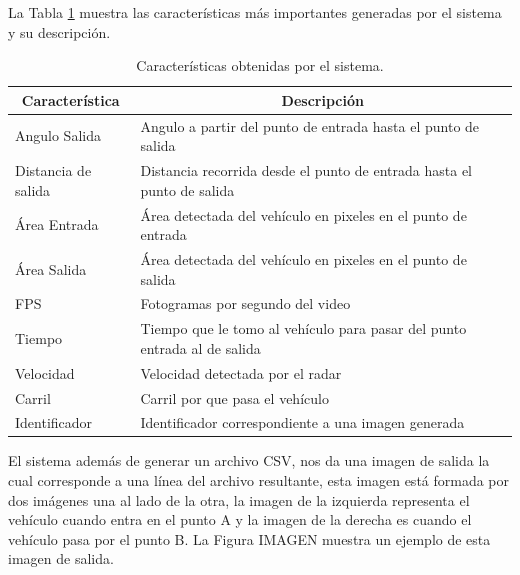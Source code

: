 La Tabla \ref{tab:CaracteristicasSistema} muestra las características más importantes generadas por el sistema y su descripción.

\begin{table}[H]
    \caption{Características obtenidas por el sistema.}
    \label{tab:CaracteristicasSistema}
    \begin{tabular}{|l|l|}
        \hline
        \multicolumn{1}{|c|}{\textbf{Característica}} & \multicolumn{1}{c|}{\textbf{Descripción}}                                \\ \hline
        Angulo Salida                                 & Angulo a partir del punto de entrada hasta el punto de salida            \\ \hline
        Distancia de salida                           & Distancia recorrida desde el punto de entrada hasta el punto de salida   \\ \hline
        Área Entrada                                  & Área detectada del vehículo en pixeles en el punto de entrada            \\ \hline
        Área Salida                                   & Área detectada del vehículo en pixeles en el punto de salida             \\ \hline
        FPS                                           & Fotogramas por segundo del video                                         \\ \hline
        Tiempo                                        & Tiempo que le tomo al vehículo para pasar del punto entrada al de salida \\ \hline
        Velocidad                                     & Velocidad detectada por el radar                                         \\ \hline
        Carril                                        & Carril por que pasa el vehículo                                          \\ \hline
        Identificador                                 & Identificador correspondiente a una imagen generada                      \\ \hline
    \end{tabular}
\end{table}


El sistema además de generar un archivo CSV, nos da una imagen de salida la cual corresponde a una línea del archivo resultante, esta imagen está formada por dos imágenes una al lado de la otra, la imagen de la izquierda representa el vehículo cuando entra en el punto A y la imagen de la derecha es cuando el vehículo pasa por el punto B. La Figura IMAGEN muestra un ejemplo de esta imagen de salida.

